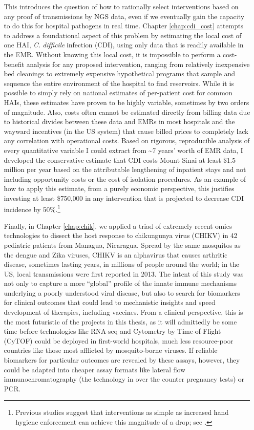 This introduces the question of how to rationally select interventions based on any proof of transmissions by NGS data, even if we eventually gain the capacity to do this for hospital pathogens in real time. Chapter \ref{chap:cdi_cost} attempts to address a foundational aspect of this problem by estimating the local cost of one HAI, \emph{C. difficile} infection (CDI), using only data that is readily available in the EMR. Without knowing this local cost, it is impossible to perform a cost-benefit analysis for any proposed intervention, ranging from relatively inexpensive bed cleanings to extremely expensive hypothetical programs that sample and sequence the entire environment of the hospital to find reservoirs. While it is possible to simply rely on national estimates of per-patient cost for common HAIs, these estimates have proven to be highly variable, sometimes by two orders of magnitude. Also, costs often cannot be estimated directly from billing data due to historical divides between these data and EMRs in most hospitals and the wayward incentives (in the US system) that cause billed prices to completely lack any correlation with operational costs.\autocite{Cooper2015} Based on rigorous, reproducible analysis of every quantitative variable I could extract from \textasciitilde{}7 years' worth of EMR data, I developed the conservative estimate that CDI costs Mount Sinai at least \$1.5 million per year based on the attributable lengthening of inpatient stays and not including opportunity costs or the cost of isolation procedures. As an example of how to apply this estimate, from a purely economic perspective, this justifies investing at least \$750,000 in any intervention that is projected to decrease CDI incidence by 50\%.\footnote{Previous studies suggest that interventions as simple as increased hand hygiene enforcement can achieve this magnitude of a drop; see \textcite{Khanafer2015}.}

Finally, in Chapter \ref{chap:chik}, we applied a triad of extremely recent omics technologies to dissect the host response to chikungunya virus (CHIKV) in 42 pediatric patients from Managua, Nicaragua. Spread by the same mosquitos as the dengue and Zika viruses, CHIKV is an alphavirus that causes arthritic disease, sometimes lasting years, in millions of people around the world; in the US, local transmissions were first reported in 2013. The intent of this study was not only to capture a more ``global'' profile of the innate immune mechanisms underlying a poorly understood viral disease, but also to search for biomarkers for clinical outcomes that could lead to mechanistic insights and speed development of therapies, including vaccines. From a clinical perspective, this is the most futuristic of the projects in this thesis, as it will admittedly be some time before technologies like RNA-seq and Cytometry by Time-of-Flight (CyTOF) could be deployed in first-world hospitals, much less resource-poor countries like those most afflicted by mosquito-borne viruses. If reliable biomarkers for particular outcomes are revealed by these assays, however, they could be adapted into cheaper assay formats like lateral flow immunochromatography (the technology in over the counter pregnancy tests) or PCR.

